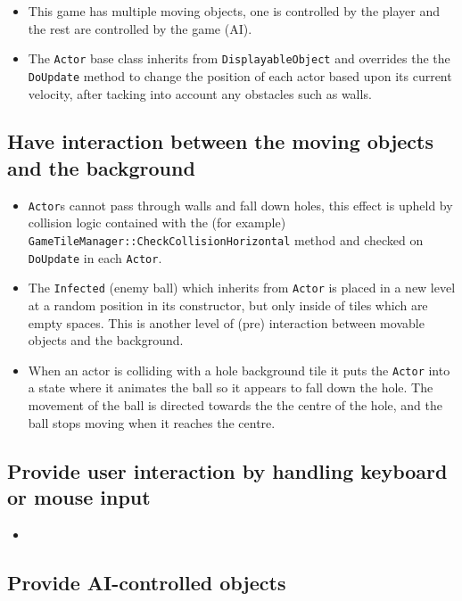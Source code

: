 \begin{itemize}
	\item This game has multiple moving objects, one is controlled by the player and the rest are controlled by the game (AI).
	\item The \verb!Actor! base class inherits from \verb!DisplayableObject! and overrides the the \verb!DoUpdate! method to change the position of each actor based upon its current velocity, after tacking into account any obstacles such as walls.
\end{itemize}

\subsection{Have interaction between the moving objects and the background}

\begin{itemize}
	\item \verb!Actor!s cannot pass through walls and fall down holes, this effect is upheld by collision logic contained with the (for example) \verb!GameTileManager::CheckCollisionHorizontal! method and checked on \verb!DoUpdate! in each \verb!Actor!.
	\item The \verb!Infected! (enemy ball) which inherits from \verb!Actor! is placed in a new level at a random position in its constructor, but only inside of tiles which are empty spaces. This is another level of (pre) interaction between movable objects and the background.
	\item When an actor is colliding with a hole background tile it puts the \verb!Actor! into a state where it animates the ball so it appears to fall down the hole. The movement of the ball is directed towards the the centre of the hole, and the ball stops moving when it reaches the centre.
\end{itemize}

\subsection{Provide user interaction by handling keyboard or mouse input}

\begin{itemize}
	\item
\end{itemize}

\subsection{Provide AI-controlled objects}

